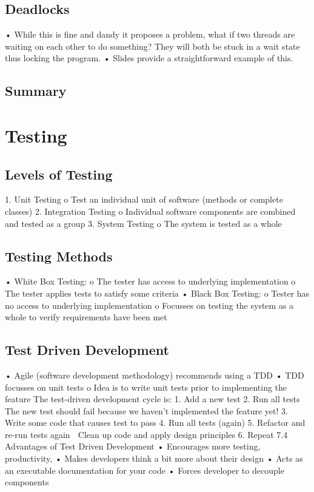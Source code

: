 \documentclass[11pt]{article}
\begin{document}
\subsection{Deadlocks}
• While this is fine and dandy it proposes a problem, what if two threads are waiting on each other to do
something? They will both be stuck in a wait state thus locking the program.
• Slides provide a straightforward example of this.
\subsection{Summary}

\section{Testing}
\subsection{Levels of Testing}
1. Unit Testing
o Test an individual unit of software (methods or complete classes)
2. Integration Testing
o Individual software components are combined and tested as a group
3. System Testing
o The system is tested as a whole
\subsection{Testing Methods}
• White Box Testing:
o The tester has access to underlying implementation
o The tester applies tests to satisfy some criteria
• Black Box Testing:
o Tester has no access to underlying implementation
o Focusses on testing the system as a whole to verify requirements have been met
\subsection{Test Driven Development}
• Agile (software development methodology) recommends using a TDD
• TDD focusses on unit tests
o Idea is to write unit tests prior to implementing the feature
The test-driven development cycle is:
1. Add a new test
2. Run all tests
 The new test should fail because we haven’t implemented the feature yet!
3. Write some code that causes test to pass
4. Run all tests (again)
5. Refactor and re-run tests again
 Clean up code and apply design principles
6. Repeat
7.4 Advantages of Test Driven Development
• Encourages more testing, productivity,
• Makes developers think a bit more about their design
• Acts as an executable documentation for your code
• Forces developer to decouple components 
\end{document}
